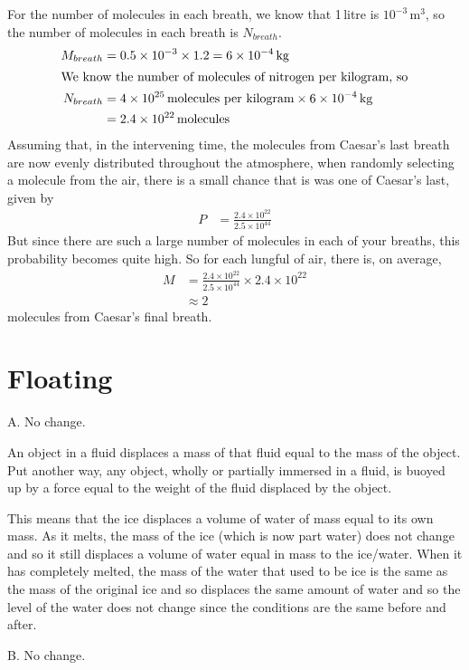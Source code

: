 For the number of molecules in each breath, we know that 1\,litre is $10^{-3}$\,m$^3$, so the number of molecules in each breath is $N_{breath}$. 
\begin{align*}
	M_{breath} &= 0.5\times 10^{-3}\times 1.2 = 6\times 10^{-4}\,\text{kg} \\
	\intertext{We know the number of molecules of nitrogen per kilogram, so}
	N_{breath} &= 4\times10^{25}\, \text{molecules per kilogram} \times 6\times 10^{-4}\,\text{kg}\\
	&= 2.4\times10^{22} \,\text{molecules}
\end{align*}
Assuming that, in the intervening time, the molecules from Caesar's last breath are now evenly distributed throughout the atmosphere, when randomly selecting a molecule from the air, there is a small chance that is was one of Caesar's last, given by
\begin{align*}
	P &= \frac{2.4\times10^{22}}{2.5\times10^{44}}
\end{align*}
But since there are such a large number of molecules in each of your breaths, this probability becomes quite high. So for each lungful of air, there is, on average,
\begin{align*}
	M &= \frac{2.4\times10^{22}}{2.5\times10^{44}} \times 2.4\times10^{22} \\
	&\approx 2
\end{align*}
molecules from Caesar's final breath.

\section{Floating}
A. No change.

An object in a fluid displaces a mass of that fluid equal to the mass of the object. Put another way, any object, wholly or partially immersed in a fluid, is buoyed up by a force equal to the weight of the fluid displaced by the object.

This means that the ice displaces a volume of water of mass equal to its own mass. As it melts, the mass of the ice (which is now part water) does not change and so it still displaces a volume of water equal in mass to the ice/water. When it has completely melted, the mass of the water that used to be ice is the same as the mass of the original ice and so displaces the same amount of water and so the level of the water does not change since the conditions are the same before and after.

B. No change. 

